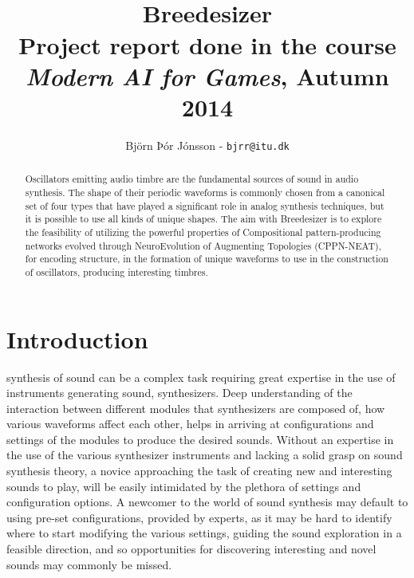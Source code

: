 \documentclass[conference]{IEEEtran}
\begin{document}


\title{\ \\ \LARGE\bf Breedesizer\\ \small Project report done in the course \textit{Modern AI for Games}, Autumn 2014}

\author{Björn Þór Jónsson - \texttt{bjrr@itu.dk}}


\maketitle

\begin{abstract}

Oscillators emitting audio timbre are the fundamental sources of sound in audio synthesis.  The shape of their periodic waveforms is commonly chosen from a canonical set of four types that have played a significant role in analog synthesis techniques, but it is possible to use all kinds of unique shapes.  The aim with Breedesizer is to explore the feasibility of utilizing the powerful properties of Compositional pattern-producing networks evolved through NeuroEvolution of Augmenting Topologies (CPPN-NEAT), for encoding structure, in the formation of unique waveforms to use in the construction of oscillators, producing interesting timbres.

\end{abstract}

\section{Introduction}

 synthesis of sound can be a complex task requiring great expertise in the use of instruments generating sound, synthesizers.  Deep understanding of the interaction between different modules that synthesizers are composed of, how various waveforms affect each other, helps in arriving at configurations and settings of the modules to produce the desired sounds.  Without an expertise in the use of the various synthesizer instruments and lacking a solid grasp on sound synthesis theory, a novice approaching the task of creating new and interesting sounds to play, will be easily intimidated by the plethora of settings and configuration options.  A newcomer to the world of sound synthesis may default to using pre-set configurations, provided by experts, as it may be hard to identify where to start modifying the various settings, guiding the sound exploration in a feasible direction, and so opportunities for discovering interesting and novel sounds may commonly be missed.
\end{document}
